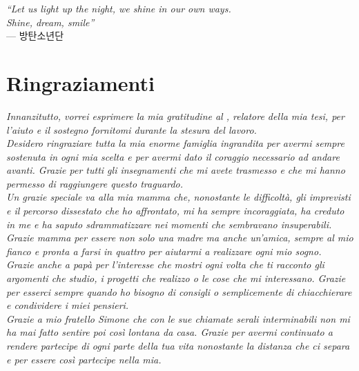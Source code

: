 
\cleardoublepage
{}
{}

\begin{flushright}{
	\slshape    
	``Let us light up the night, we shine in our own ways. \\
		Shine, dream, smile''} \\ 
	\medskip
    --- 방탄소년단
\end{flushright}


\bigskip

\begingroup
\let\clearpage\relax
\let\cleardoublepage\relax
\let\cleardoublepage\relax

\chapter*{Ringraziamenti}

\noindent \textit{Innanzitutto, vorrei esprimere la mia gratitudine al \profTitle \myProf, relatore della mia tesi, per l'aiuto e il sostegno fornitomi durante la stesura del lavoro.}\\

\noindent \textit{Desidero ringraziare tutta la mia enorme famiglia ingrandita per avermi sempre sostenuta in ogni mia scelta e per avermi dato il coraggio necessario ad andare avanti. Grazie per tutti gli insegnamenti che mi avete trasmesso e che mi hanno permesso di raggiungere questo traguardo. \\
 	Un grazie speciale va alla mia mamma che, nonostante le difficoltà, gli imprevisti e il percorso dissestato che ho affrontato, mi ha sempre incoraggiata, ha creduto in me e ha saputo sdrammatizzare nei momenti che sembravano insuperabili. Grazie mamma per essere non solo una madre ma anche un'amica, sempre al mio fianco e pronta a farsi in quattro per aiutarmi a realizzare ogni mio sogno. \\
 	Grazie anche a papà per l'interesse che mostri ogni volta che ti racconto gli argomenti che studio, i progetti che realizzo o le cose che mi interessano. Grazie per esserci sempre quando ho bisogno di consigli o semplicemente di chiacchierare e condividere i miei pensieri. \\
	Grazie a mio fratello Simone che con le sue chiamate serali interminabili non mi ha mai fatto sentire poi così lontana da casa. Grazie per avermi continuato a rendere partecipe di ogni parte della tua vita nonostante la distanza che ci separa e per essere così partecipe nella mia.}\\
 
